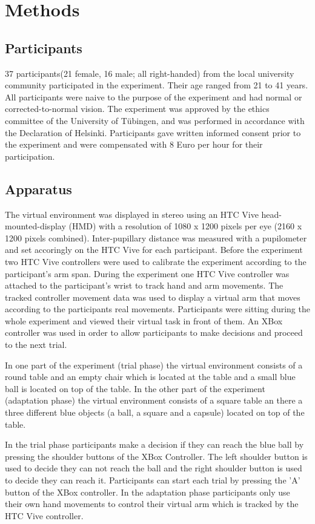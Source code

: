 \section{Methods}

\subsection{Participants}
37 participants(21 female, 16 male; all right-handed) from the local university community participated in the experiment. Their age ranged from 21 to 41 years. All participants were naive to the purpose of the experiment and had normal or corrected-to-normal vision. The experiment was approved by the ethics committee of the University of T\"ubingen, and was performed in accordance with the Declaration of Helsinki. Participants gave written informed consent prior to the experiment and were compensated with 8 Euro per hour for their participation. 

\subsection{Apparatus}
The virtual environment was displayed in stereo using an HTC Vive head-mounted-display (HMD) with a resolution of 1080 x 1200 pixels per eye (2160 x 1200 pixels combined). Inter-pupillary distance was measured with a pupilometer and set accoringly on the HTC Vive for each participant. Before the experiment two HTC Vive controllers were used to calibrate the experiment according to the participant's arm span. During the experiment one HTC Vive controller was attached to the participant's wrist to track hand and arm movements. The tracked controller movement data was used to display a virtual arm that moves according to the participants real movements. Participants were sitting during the whole experiment and viewed their virtual task in front of them. An XBox controller was used in order to allow participants to make decisions and proceed to the next trial.

In one part of the experiment (trial phase) the virtual environment consists of a round table and an empty chair which is located at the table and a small blue ball is located on top of the table. In the other part of the experiment (adaptation phase) the virtual environment consists of a square table an there a three different blue objects (a ball, a square and a capsule) located on top of the table. 


In the trial phase participants make a decision if they can reach the blue ball by pressing the shoulder buttons of the XBox Controller. The left shoulder button is used to decide they can not reach the ball and the right shoulder button is used to decide they can reach it. Participants can start each trial by pressing the 'A' button of the XBox controller. In the adaptation phase participants only use their own hand movements to control their virtual arm which is tracked by the HTC Vive controller.

